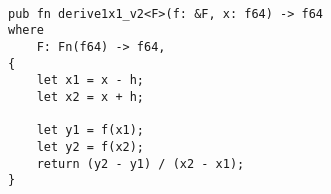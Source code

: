 \begin{lstlisting}[]

pub fn derive1x1_v2<F>(f: &F, x: f64) -> f64
where
    F: Fn(f64) -> f64,
{
    let x1 = x - h;
    let x2 = x + h;

    let y1 = f(x1);
    let y2 = f(x2);
    return (y2 - y1) / (x2 - x1);
}


\end{lstlisting}
